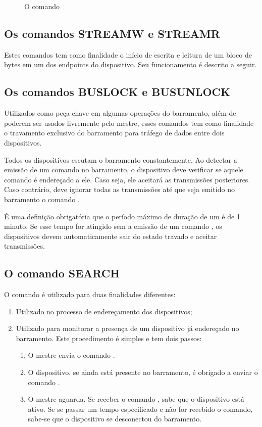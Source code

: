 \documentclass[11pt]{report}
\begin{document}
\begin{figure}[H]
\centering

\caption{O comando }
\end{figure}

\subsection{Os comandos STREAMW e STREAMR}

Estes comandos tem como finalidade o início de escrita e leitura de um bloco de bytes em um dos endpoints do dispositivo. Seu funcionamento é descrito a seguir.

\subsection{Os comandos BUSLOCK e BUSUNLOCK}

Utilizados como peça chave em algumas operações do barramento, além de poderem ser usados livremente pelo mestre, esses comandos tem como finalidade o travamento exclusivo do barramento para tráfego de dados entre dois dispositivos.

Todos os dispositivos escutam o barramento constantemente. Ao detectar a emissão de um comando  no barramento, o dispositivo deve verificar se aquele comando é endereçado a ele. Caso seja, ele aceitará as transmissões posteriores. Caso contrário, deve ignorar todas as transmissões até que seja emitido no barramento o comando .

É uma definição obrigatória que o período máximo de duração de um  é de 1 minuto. Se esse tempo for atingido sem a emissão de um comando , os dispositivos devem automaticamente sair do estado travado e aceitar transmissões.

\subsection{O comando SEARCH}

O comando  é utilizado para duas finalidades diferentes:

\begin{enumerate}

\item Utilizado no processo de endereçamento dos dispositivos;
\item Utilizado para monitorar a presença de um dispositivo já endereçado no barramento. Este procedimento é simples e tem dois passos:
\begin{enumerate}
\item O mestre envia o comando .
\item O dispositivo, se ainda está presente no barramento, é obrigado a enviar o comando .
\item O mestre aguarda. Se receber o comando , sabe que o dispositivo está ativo. Se se passar um tempo especificado e não for recebido o comando, sabe-se que o dispositivo se desconectou do barramento.
\end{enumerate}

\end{enumerate}
\end{document}
